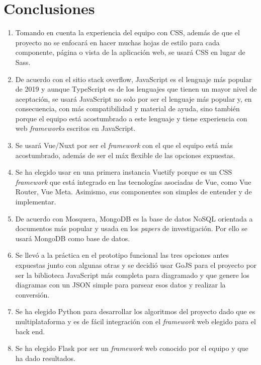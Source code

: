 \section{Conclusiones}

\begin{enumerate}
    \item Tomando en cuenta la experiencia del equipo con CSS, además de que el proyecto no se enfocará en hacer muchas hojas de estilo para cada componente, página o vista de la aplicación web, se usará CSS en lugar de Sass.
    \item De acuerdo con el sitio stack overflow\cite{noauthor_stack_nodate}, JavaScript es el lenguaje más popular de 2019 y aunque TypeScript es de los lenguajes que tienen un mayor nivel de aceptación, se usará JavaScript no solo por ser el lenguaje más popular y, en consecuencia, con más compatibilidad y material de ayuda, sino también porque el equipo está acostumbrado a este lenguaje y tiene experiencia con web \textit{frameworks} escritos en JavaScript.
    \item Se usará Vue/Nuxt por ser el \textit{framework} con el que el equipo está más acostumbrado, además de ser el máx flexible de las opciones expuestas.
    \item Se ha elegido usar en una primera instancia Vuetify porque es un CSS \textit{framework} que está integrado en las tecnologías asociadas de Vue, como Vue Router, Vue Meta. Asimismo, sus componentes son simples de entender y de implementar.
    \item De acuerdo con Mosquera\cite{martinez-mosquera_modeling_2020}, MongoDB es la base de datos NoSQL orientada a documentos más popular y usada en los \textit{papers} de investigación. Por ello se usará MongoDB como base de datos.
    \item Se llevó a la práctica en el prototipo funcional las tres opciones antes expuestas junto con algunas otras y se decidió usar GoJS para el proyecto por ser la biblioteca JavaScript más completa para diagramado y que genere los diagramas con un JSON simple para parsear esos datos y realizar la conversión.
    \item Se ha elegido Python para desarrollar los algoritmos del proyecto dado que es multiplataforma y es de fácil integración con el \textit{framework} web elegido para el back end.
    \item Se ha elegido Flask por ser un \textit{framework} web conocido por el equipo y que ha dado resultados.

\end{enumerate}
